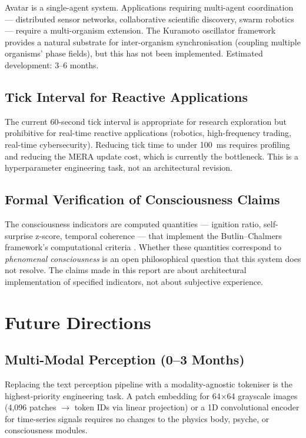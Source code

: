 \documentclass[12pt,a4paper]{article}
\begin{document}
Avatar is a single-agent system. Applications requiring multi-agent coordination ---
distributed sensor networks, collaborative scientific discovery, swarm robotics ---
require a multi-organism extension. The Kuramoto oscillator framework provides a
natural substrate for inter-organism synchronisation (coupling multiple organisms'
phase fields), but this has not been implemented. Estimated development: 3--6 months.

\subsection{Tick Interval for Reactive Applications}

The current 60-second tick interval is appropriate for research exploration but
prohibitive for real-time reactive applications (robotics, high-frequency trading,
real-time cybersecurity). Reducing tick time to under 100~ms requires profiling and
reducing the MERA update cost, which is currently the bottleneck. This is a
hyperparameter engineering task, not an architectural revision.

\subsection{Formal Verification of Consciousness Claims}

The consciousness indicators are computed quantities --- ignition ratio, self-surprise
z-score, temporal coherence --- that implement the Butlin--Chalmers framework's
computational criteria \cite{butlin2023consciousness}. Whether these quantities
correspond to \emph{phenomenal consciousness} is an open philosophical question that
this system does not resolve. The claims made in this report are about architectural
implementation of specified indicators, not about subjective experience.

\section{Future Directions}

\subsection{Multi-Modal Perception (0--3 Months)}

Replacing the text perception pipeline with a modality-agnostic tokeniser is the
highest-priority engineering task. A patch embedding for 64$\times$64 grayscale images
(4{,}096 patches $\to$ token IDs via linear projection) or a 1D convolutional encoder
for time-series signals requires no changes to the physics body, psyche, or
consciousness modules.
\end{document}
